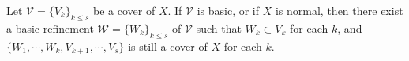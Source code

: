 Let $\mathcal{V} = \{V_k\}_{k \leq s}$ be a cover of $X$. If $\mathcal{V}$ is basic, or if $X$ is normal, then there exist a basic refinement $\mathcal{W} = \{W_k\}_{k \leq s}$ of $\mathcal{V}$ such that $W_k \subset V_k$ for each $k$, and $\{W_1, \cdots, W_k, V_{k+1}, \cdots, V_s\}$ is still a cover of $X$ for each $k$.
